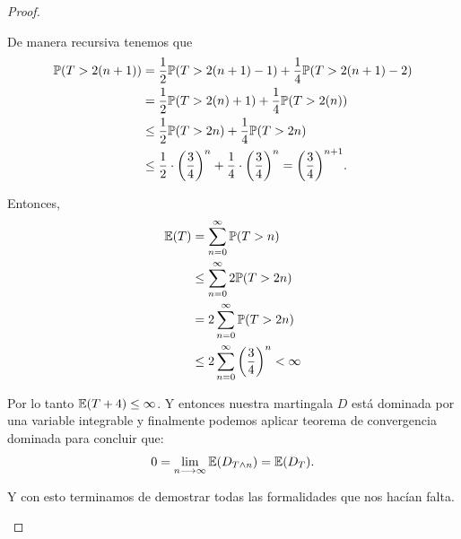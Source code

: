 \begin{proof}
\begin{enumerate}
		    De manera recursiva tenemos que
		    \begin{align}
		       	\mathbb{P}(T > 2(n+1)) &=     \frac{1}{2} \mathbb{P}(T > 2(n+1) - 1) + \frac{1}{4} \mathbb{P}(T > 2(n+1) - 2) \\
						       	&=     \frac{1}{2} \mathbb{P}(T > 2(n) + 1) + \frac{1}{4} \mathbb{P}(T > 2(n)) \\
		       				   &\leq  \frac{1}{2} \mathbb{P}(T > 2n) + \frac{1}{4} \mathbb{P}(T > 2n) \\
		       				   &\leq  \frac{1}{2} \cdot \bigg(\frac{3}{4}\bigg)^{n} + \frac{1}{4} \cdot \bigg(\frac{3}{4}\bigg)^{n} = 		
		       				   \bigg(\frac{3}{4}\bigg)^{n+1}.
		    \end{align}
		    
		    Entonces,
		    \begin{align}
		    	\mathbb{E}(T) 	&= 		\sum_{n=0}^\infty \mathbb{P}(T > n) \\
		    			&\leq 	\sum_{n=0}^\infty 2\mathbb{P}(T > 2n) \\
		    			&= 		2 \sum_{n=0}^\infty \mathbb{P}(T > 2n) \\
		    			&\leq 	2 \sum_{n=0}^\infty \bigg(\frac{3}{4}\bigg)^{n} < \infty\\
		    \end{align}
		    
		    Por lo tanto $\mathbb{E}(T + 4) \leq \infty$. Y entonces nuestra martingala $D$ está dominada por una variable integrable y finalmente
		    podemos aplicar teorema de convergencia dominada para concluir que:
		    \begin{align}
		    	0 = \lim_{n \longrightarrow \infty} \mathbb{E}(D_{T \wedge n}) = \mathbb{E}(D_T).
		    \end{align}
		    
		    Y con esto terminamos de demostrar todas las formalidades que nos hacían falta.
	\end{enumerate}
\end{proof}
